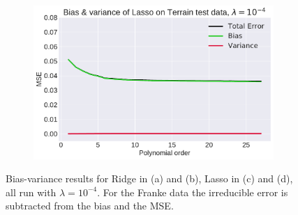 \documentclass[10pt, twocolumn]{article}
\begin{document}
\begin{appendices}
\begin{figure}[h!]
\begin{subfigure}[t]{0.45\textwidth}
    \caption{}
    \label{fig:boostrap_franke_lasse}
    \end{subfigure}
    \begin{subfigure}[t]{0.45\textwidth}
    \centering
    \includegraphics[scale=0.4]{../figs/BV_bootstrap_Terrain_Lasso.pdf}
    \caption{}
    \label{fig:boostrap_terrain_lasso}
    \end{subfigure}
\caption{Bias-variance results for Ridge in (a) and (b), Lasso in (c) and (d), all run with $\lambda = 10^{-4}$. For the Franke data the irreducible error is subtracted from the bias and the MSE.}
\end{figure}

\end{appendices}
\end{document}
